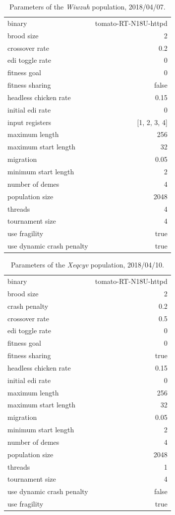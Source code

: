 \documentclass[12pt,glossary]{dalthesis}
\begin{document}
\begin{table}[htbp]
\caption{Parameters of the \emph{Wiwzuh} population, 2018/04/07.}
\centering
\begin{tabular}{lr}
binary & tomato-RT-N18U-httpd\\
brood size & 2\\
crossover rate & 0.2\\
edi toggle rate & 0\\
fitness goal & 0\\
fitness sharing & false\\
headless chicken rate & 0.15\\
initial edi rate & 0\\
input registers & [1, 2, 3, 4]\\
maximum length & 256\\
maximum start length & 32\\
migration & 0.05\\
minimum start length & 2\\
number of demes & 4\\
population size & 2048\\
threads & 4\\
tournament size & 4\\
use fragility & true\\
use dynamic crash penalty & true\\
\end{tabular}
\end{table}

\begin{table}[htbp]
\caption{Parameters of the \emph{Xeqcyv} population, 2018/04/10.}
\centering
\begin{tabular}{lr}
binary & tomato-RT-N18U-httpd\\
brood size & 2\\
crash penalty & 0.2\\
crossover rate & 0.5\\
edi toggle rate & 0\\
fitness goal & 0\\
fitness sharing & true\\
headless chicken rate & 0.15\\
initial edi rate & 0\\
maximum length & 256\\
maximum start length & 32\\
migration & 0.05\\
minimum start length & 2\\
number of demes & 4\\
population size & 2048\\
threads & 1\\
tournament size & 4\\
use dynamic crash penalty & false\\
use fragility & true\\
\end{tabular}
\end{table}
\end{document}
